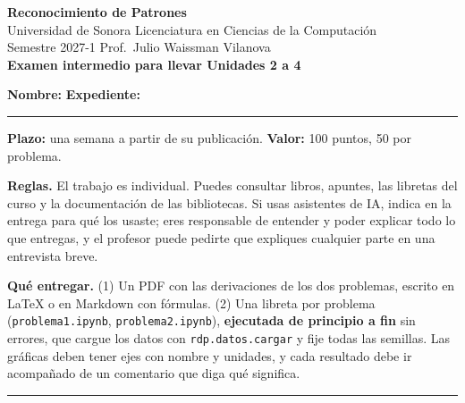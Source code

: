 \documentclass[11pt]{article}
\newcommand{\encabezado}[2]{%
\begin{center}
{\large\bfseries Reconocimiento de Patrones}\\[2pt]
Universidad de Sonora \textperiodcentered{} Licenciatura en Ciencias de la Computación\\
Semestre 2027-1 \textperiodcentered{} Prof.\ Julio Waissman Vilanova\\[10pt]
{\Large\bfseries #1}%
\ifdefined\tipodoc\\[4pt]{\large\itshape\tipodoc}\fi
\end{center}
\ifdefined\tipodoc\else
\vspace{6pt}
\textbf{Nombre:} \hrulefill\quad \textbf{Expediente:} \rule{3.5cm}{0.4pt}\par
\vspace{6pt}
\fi
#2
\par\medskip\hrule\medskip
}
\begin{document}
\encabezado{Examen intermedio para llevar \textperiodcentered{} Unidades 2 a 4}{%
\textbf{Plazo:} una semana a partir de su publicación. \textbf{Valor:} 100 puntos, 50 por problema.\par
\textbf{Reglas.} El trabajo es individual. Puedes consultar libros, apuntes, las libretas del curso y la documentación de las bibliotecas. Si usas asistentes de IA, indica en la entrega para qué los usaste; eres responsable de entender y poder explicar todo lo que entregas, y el profesor puede pedirte que expliques cualquier parte en una entrevista breve.\par
\textbf{Qué entregar.} (1) Un PDF con las derivaciones de los dos problemas, escrito en \LaTeX{} o en Markdown con fórmulas. (2) Una libreta por problema (\texttt{problema1.ipynb}, \texttt{problema2.ipynb}), \textbf{ejecutada de principio a fin} sin errores, que cargue los datos con \texttt{rdp.datos.cargar} y fije todas las semillas. Las gráficas deben tener ejes con nombre y unidades, y cada resultado debe ir acompañado de un comentario que diga qué significa.}
\end{document}
